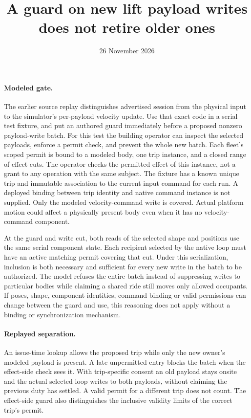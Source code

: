 \documentclass[11pt]{article}
\title{A guard on new lift payload writes does not retire older ones}
\date{26 November 2026}
\begin{document}
\maketitle

\paragraph{Modeled gate.}
The earlier source replay distinguishes advertised session from the
physical input to the simulator's per-payload velocity update.
Use that exact code in a serial test fixture, and put an authored
guard immediately before a proposed nonzero payload-write batch.
For this test the building operator can inspect the selected payloads,
enforce a permit check, and prevent the whole new batch. Each fleet's
scoped permit is bound to a modeled body, one trip instance, and a
closed range of effect cuts. The operator checks the permitted effect
of this instance, not a grant to any operation with the same subject.
The fixture has a known unique trip and immutable association to
the current input command for each run. A deployed binding between
trip identity and native command instance is not supplied.
Only the modeled velocity-command write is covered. Actual platform
motion could affect a physically present body even when it has
no velocity-command component.

At the guard and write cut, both reads of the selected shape and
positions use the same serial component state. Each recipient selected
by the native loop must have an active matching permit covering that
cut. Under this serialization, inclusion is both necessary and sufficient
for every new write in the batch to be authorized. The model refuses
the entire batch instead of suppressing writes to particular bodies
while claiming a shared ride still moves only allowed occupants.
If poses, shape, component identities, command binding or valid
permissions can change between the guard and use, this reasoning
does not apply without a binding or synchronization mechanism.

\paragraph{Replayed separation.}
An issue-time lookup allows the proposed trip while only the new
owner's modeled payload is present. A late unpermitted entry
blocks the batch when the effect-side check sees it. With trip-specific
consent an old payload stays onsite and the actual selected loop
writes to both payloads, without claiming the previous duty has
settled. A valid permit for a different trip does not count. The
effect-side guard also distinguishes the inclusive validity limits
of the correct trip's permit.
\end{document}
